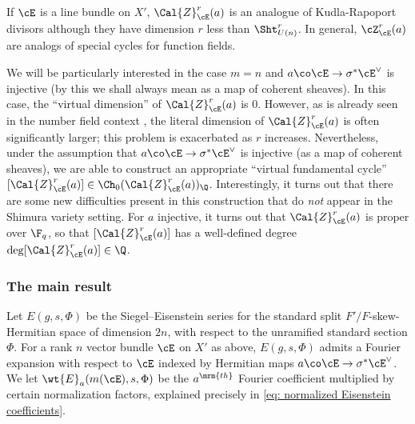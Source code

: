 If $\cE$ is a line bundle on $X'$,  $\Cal{Z}_{\cE}^r(a)$ is an analogue of Kudla-Rapoport divisors although they have dimension $r$ less than $\Sht_{U(n)}^{r}$. In general, $\cZ_{\cE}^{r}(a)$ are analogs of special cycles for function fields.

We will be particularly interested in the case $m=n$ and $a \co \cE \rightarrow \sigma^* \cE^{\vee}$ is injective (by this we shall always mean as a map of coherent sheaves). In this case, the ``virtual dimension'' of $\Cal{Z}_{\cE}^r(a)$ is $0$. However, as is already seen in the number field context \cite{KRII}, the literal dimension of $\Cal{Z}_{\cE}^r(a)$ is often significantly larger; this problem is exacerbated as $r$ increases. Nevertheless, under the assumption that $a \co \cE \rightarrow \sigma^* \cE^{\vee}$ is injective (as a map of coherent sheaves), we are able to construct an appropriate ``virtual fundamental cycle'' $[\Cal{Z}_{\cE}^r(a) ] \in \Ch_0(\Cal{Z}_{\cE}^r(a))_{\Q}$. Interestingly, it turns out that there are some new difficulties present in this construction that do \emph{not} appear in the Shimura variety setting. For $a$ injective, it turns out that $\Cal{Z}_{\cE}^r(a)$ is proper over $\F_{q}$, so that $[\Cal{Z}_{\cE}^r(a) ] $ has a well-defined degree $\deg[\Cal{Z}_{\cE}^r(a) ] \in \Q$.



\subsubsection{The main result}
Let $E(g,s, \Phi)$ be the Siegel--Eisenstein series for the standard split $F'/F$-skew-Hermitian space of dimension $2n$, with respect to the unramified standard section $\Phi$. For a rank $n$ vector bundle $\cE$ on $X'$ as above, $E(g,s, \Phi)$ admits a Fourier expansion with respect to $\cE$ indexed by Hermitian maps $a \co \cE \rightarrow \sigma^* \cE^{\vee}$. We let $ \wt{E}_{a}(m(\cE),s,\Phi)$ be the $a^{\mrm{th}}$ Fourier coefficient multiplied by certain normalization factors, explained precisely in \eqref{eq: normalized Eisenstein coefficients}.



